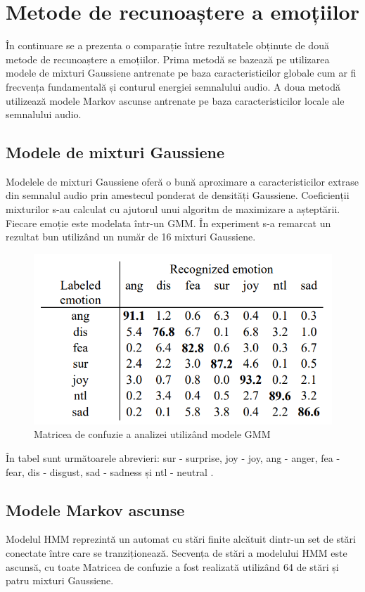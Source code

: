 \documentclass[9pt,shortpaper,twoside,web]{ieeecolor}
\begin{document}
\section{Metode de recunoaștere a emoțiilor}
În continuare se a prezenta o comparație între rezultatele obținute de două metode de recunoaștere a emoțiilor. Prima metodă se bazează pe utilizarea modele de mixturi Gaussiene antrenate pe baza caracteristicilor globale cum ar fi frecvența fundamentală și conturul energiei semnalului audio. A doua metodă utilizează modele Markov ascunse antrenate pe baza caracteristicilor locale ale semnalului audio. 

\subsection{Modele de mixturi Gaussiene}
Modelele de mixturi Gaussiene oferă o bună aproximare a caracteristicilor extrase din semnalul audio prin amestecul ponderat de densități Gaussiene. Coeficienții mixturilor s-au calculat cu ajutorul unui algoritm de maximizare a așteptării. Fiecare emoție este modelata într-un GMM. În experiment s-a remarcat un rezultat bun utilizând un număr de 16 mixturi Gaussiene.

\begin{figure}[htb]
\includegraphics[width=0.9\columnwidth]{res/fig/GMM}
\caption{Matricea de confuzie a analizei utilizând modele GMM \cite{b8}}
\label{fig4}
\end{figure}

 În tabel sunt următoarele abrevieri: sur - surprise, joy - joy, ang - anger, fea - fear, dis - disgust, sad - sadness și ntl - neutral \cite{b8}.



\subsection{Modele Markov ascunse}
Modelul HMM reprezintă un automat cu stări finite alcătuit dintr-un set de stări conectate între care se tranziționează. Secvența de stări a modelului HMM este ascunsă, cu toate
Matricea de confuzie a fost realizată utilizând 64 de stări și patru mixturi Gaussiene. 
\end{document}
